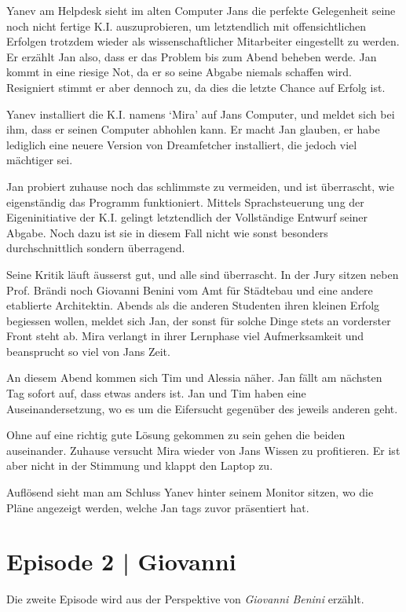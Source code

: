 \documentclass[11pt,a4paper,ngerman]{scrreprt}
\begin{document}
Yanev am Helpdesk sieht im alten Computer Jans die perfekte Gelegenheit seine
noch nicht fertige K.I. auszuprobieren, um letztendlich mit offensichtlichen
Erfolgen trotzdem wieder als wissenschaftlicher Mitarbeiter eingestellt zu
werden. Er erzählt Jan also, dass er das Problem bis zum Abend beheben
werde. Jan kommt in eine riesige Not, da er so seine Abgabe niemals schaffen
wird. Resigniert stimmt er aber dennoch zu, da dies die letzte Chance auf Erfolg
ist.

Yanev installiert die K.I. namens `Mira' auf Jans Computer, und meldet sich bei
ihm, dass er seinen Computer abhohlen kann. Er macht Jan glauben, er habe
lediglich eine neuere Version von Dreamfetcher installiert, die jedoch viel
mächtiger sei.

Jan probiert zuhause noch das schlimmste zu vermeiden, und ist überrascht, wie
eigenständig das Programm funktioniert. Mittels Sprachsteuerung ung der
Eigeninitiative der K.I. gelingt letztendlich der Vollständige Entwurf seiner
Abgabe. Noch dazu ist sie in diesem Fall nicht wie sonst besonders
durchschnittlich sondern überragend.

Seine Kritik läuft äusserst gut, und alle sind überrascht. In der Jury sitzen
neben Prof. Brändi noch Giovanni Benini vom Amt für Städtebau und eine andere
etablierte Architektin. Abends als die anderen Studenten ihren kleinen Erfolg
begiessen wollen, meldet sich Jan, der sonst für solche Dinge stets an
vorderster Front steht ab. Mira verlangt in ihrer Lernphase viel Aufmerksamkeit
und beansprucht so viel von Jans Zeit.

An diesem Abend kommen sich Tim und Alessia näher. Jan fällt am nächsten Tag
sofort auf, dass etwas anders ist. Jan und Tim haben eine Auseinandersetzung, wo
es um die Eifersucht gegenüber des jeweils anderen geht.

Ohne auf eine richtig gute Lösung gekommen zu sein gehen die beiden
auseinander. Zuhause versucht Mira wieder von Jans Wissen zu profitieren. Er ist
aber nicht in der Stimmung und klappt den Laptop zu.

Auflösend sieht man am Schluss Yanev hinter seinem Monitor sitzen, wo die Pläne
angezeigt werden, welche Jan tags zuvor präsentiert hat.

\section*{Episode 2 | Giovanni}

Die zweite Episode wird aus der Perspektive von \emph{Giovanni Benini} erzählt.
\end{document}
